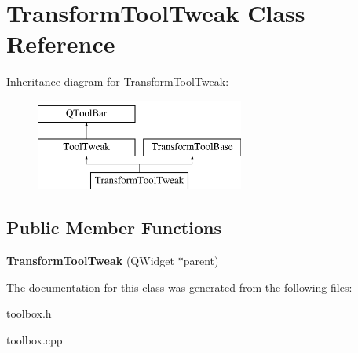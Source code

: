 \hypertarget{class_transform_tool_tweak}{\section{Transform\-Tool\-Tweak Class Reference}
\label{class_transform_tool_tweak}
}
Inheritance diagram for Transform\-Tool\-Tweak\-:\begin{figure}[H]
\begin{center}
\leavevmode
\includegraphics[height=3.000000cm]{class_transform_tool_tweak}
\end{center}
\end{figure}
\subsection*{Public Member Functions}
\begin{DoxyCompactItemize}
\item 
\hypertarget{class_transform_tool_tweak_afc1a7633c591d1eb0b1ebcf912857060}{{\bfseries Transform\-Tool\-Tweak} (Q\-Widget $\ast$parent)}\label{class_transform_tool_tweak_afc1a7633c591d1eb0b1ebcf912857060}

\end{DoxyCompactItemize}


The documentation for this class was generated from the following files\-:\begin{DoxyCompactItemize}
\item 
toolbox.\-h\item 
toolbox.\-cpp\end{DoxyCompactItemize}
